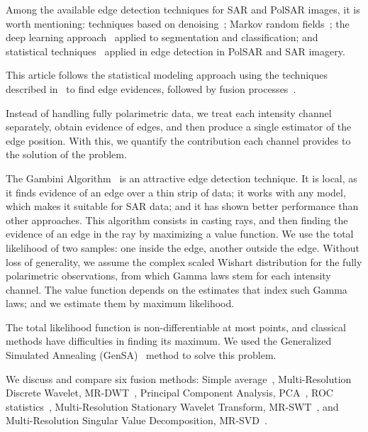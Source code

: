 \documentclass[journal]{IEEEtran}
\begin{document}
Among the available edge detection techniques for SAR and PolSAR images, it is worth mentioning: techniques based on denoising~\cite{sjx, lzly, wxbzw, cgaf};   
Markov random fields~\cite{bf};	
the deep learning approach~\cite{ztmxzxf} applied to segmentation and classification; and
statistical techniques~\cite{gmbf, fbgm, nhfc} applied in edge detection in PolSAR and SAR imagery.

This article follows the statistical modeling approach using the techniques described in~\cite{gmbf, fbgm, nhfc} to find edge evidences, followed by fusion processes~\cite{mit, bmf_2019}. 

Instead of handling fully polarimetric data, we treat each intensity channel separately, obtain evidence of edges, and then produce a single estimator of the edge position.
With this, we quantify the contribution each channel provides to the solution of the problem.

The Gambini Algorithm~\cite{gmbf_sc} is an attractive edge detection technique.
It is local, as it finds evidence of an edge over a thin strip of data; 
it works with any model, which makes it suitable for SAR data; 
and it has shown better performance than other approaches.
This algorithm consists in casting rays, and then finding the evidence of an edge in the ray by maximizing a value function.
We use the total likelihood of two samples: one inside the edge, another outside the edge.
Without loss of generality, we assume the complex scaled Wishart distribution for the fully polarimetric observations, from which Gamma laws stem for each intensity channel.
The value function depends on the estimates that index such Gamma laws; and
we estimate them by maximum likelihood.

The total likelihood function is non-differentiable at most points, and classical methods have difficulties in finding its maximum. 
We used the Generalized Simulated Annealing (GenSA)~\cite{xgsh} method to solve this problem. 

We discuss and compare six fusion methods:
Simple average~\cite{mit}, 
Multi-Resolution Discrete Wavelet, MR-DWT~\cite{n_r},
Principal Component Analysis, PCA~\cite{n_r,mit},
ROC statistics~\cite{gs},
Multi-Resolution Stationary Wavelet Transform, MR-SWT~\cite{n_r, jjly}, and 
Multi-Resolution Singular Value Decomposition, MR-SVD~\cite{naidu}.

\end{document}
